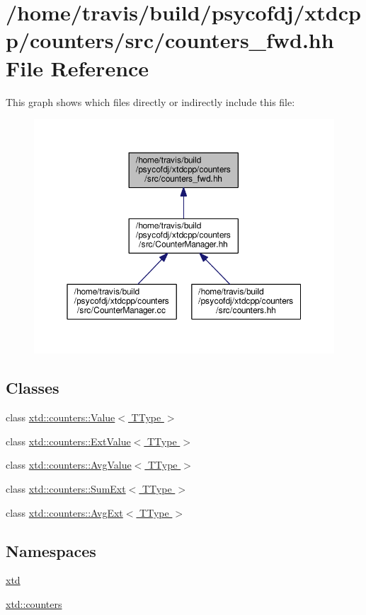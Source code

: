\hypertarget{counters__fwd_8hh}{\section{/home/travis/build/psycofdj/xtdcpp/counters/src/counters\-\_\-fwd.hh File Reference}
\label{counters__fwd_8hh}
}
This graph shows which files directly or indirectly include this file\-:
\nopagebreak
\begin{figure}[H]
\begin{center}
\leavevmode
\includegraphics[width=350pt]{counters__fwd_8hh__dep__incl}
\end{center}
\end{figure}
\subsection*{Classes}
\begin{DoxyCompactItemize}
\item 
class \hyperlink{classxtd_1_1counters_1_1Value}{xtd\-::counters\-::\-Value$<$ T\-Type $>$}
\item 
class \hyperlink{classxtd_1_1counters_1_1ExtValue}{xtd\-::counters\-::\-Ext\-Value$<$ T\-Type $>$}
\item 
class \hyperlink{classxtd_1_1counters_1_1AvgValue}{xtd\-::counters\-::\-Avg\-Value$<$ T\-Type $>$}
\item 
class \hyperlink{classxtd_1_1counters_1_1SumExt}{xtd\-::counters\-::\-Sum\-Ext$<$ T\-Type $>$}
\item 
class \hyperlink{classxtd_1_1counters_1_1AvgExt}{xtd\-::counters\-::\-Avg\-Ext$<$ T\-Type $>$}
\end{DoxyCompactItemize}
\subsection*{Namespaces}
\begin{DoxyCompactItemize}
\item 
\hyperlink{namespacextd}{xtd}
\item 
\hyperlink{namespacextd_1_1counters}{xtd\-::counters}
\end{DoxyCompactItemize}

